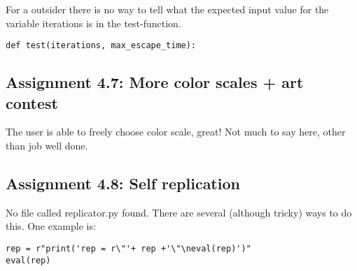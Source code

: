 \documentclass[a4paper]{article}
\begin{document}
For a outsider there is no way to tell what the expected input value for the variable iterations is in the test-function.

\begin{verbatim}
def test(iterations, max_escape_time):
\end{verbatim}

\subsection*{Assignment 4.7: More color scales + art contest}
The user is able to freely choose color scale, great!
Not much to say here, other than job well done.

\subsection*{Assignment 4.8: Self replication}
No file called replicator.py found.
There are several (although tricky) ways to do this. One example is:

\begin{verbatim}
rep = r"print('rep = r\"'+ rep +'\"\neval(rep)')"
eval(rep)
\end{verbatim}



\end{document}
